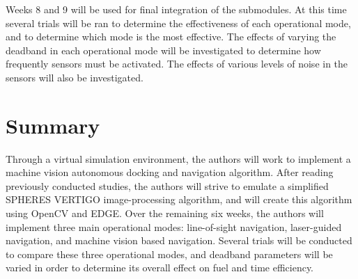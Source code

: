 \documentclass[journal, 10pt]{IEEEtran}
\begin{document}
Weeks 8 and 9 will be used for final integration of the submodules. At this time several trials will be ran to determine the effectiveness of each operational mode, and to determine which mode is the most effective. The effects of varying the deadband in each operational mode will be investigated to determine how frequently sensors must be activated. The effects of various levels of noise in the sensors will also be investigated.

%


\section{Summary}

Through a virtual simulation environment, the authors will work to implement a machine vision autonomous docking and navigation algorithm. After reading previously conducted studies, the authors will strive to emulate a simplified SPHERES VERTIGO image-processing algorithm, and will create this algorithm using OpenCV and EDGE. Over the remaining six weeks, the authors will implement three main operational modes: line-of-sight navigation, laser-guided navigation, and machine vision based navigation. Several trials will be conducted to compare these three operational modes, and deadband parameters will be varied in order to determine its overall effect on fuel and time efficiency.


\nocite{*}

{}
\end{document}
